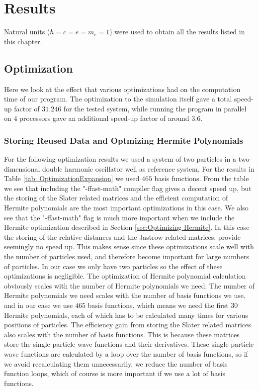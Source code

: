 \documentclass[../main.tex]{subfiles}
\begin{document}
\chapter{Results}\label{sec: Results}

Natural units ($\hbar=c=e=m_e=1$) were used to obtain all the results listed in this chapter.

\section{Optimization}

Here we look at the effect that various optimizations had on the computation time of our program. The optimization to the simulation itself gave a total speed-up factor of $31.246$ for the tested system, while running the program in parallel on $4$ processors gave an additional speed-up factor of around $3.6$.

\subsection{Storing Reused Data and Optmizing Hermite Polynomials}

For the following optimization results we used a system of two particles in a two-dimensional double harmonic oscillator well as reference system. For the results in Table \ref{tab: OptimizationExpansion} we used $465$ basis functions. From the table we see that including the "-ffast-math" compiler flag gives a decent speed up, but the storing of the Slater related matrices and the efficient computation of Hermite polynomials are the most important optimizations in this case. We also see that the "-ffast-math" flag is much more important when we include the Hermite optimization described in Section \ref{sec:Optimizing Hermite}. In this case the storing of the relative distances and the Jastrow related matrices, provide seemingly no speed up. This makes sense since these optimizations scale well with the number of particles used, and therefore become important for large numbers of particles. In our case we only have two particles so the effect of these optimizations is negligible. The optimization of Hermite polynomial calculation obviously scales with the number of Hermite polynomials we need. The number of Hermite polynomials we need scales with the number of basis functions we use, and in our case we use $465$ basis functions, which means we need the first $30$ Hermite polynomials, each of which has to be calculated many times for various positions of particles. The efficiency gain from storing the Slater related matrices also scales with the number of basis functions. This is because these matrices store the single particle wave functions and their derivatives. These single particle wave functions are calculated by a loop over the number of basis functions, so if we avoid recalculating them unnecessarily, we reduce the number of basis function loops, which of course is more important if we use a lot of basis functions.
\end{document}
